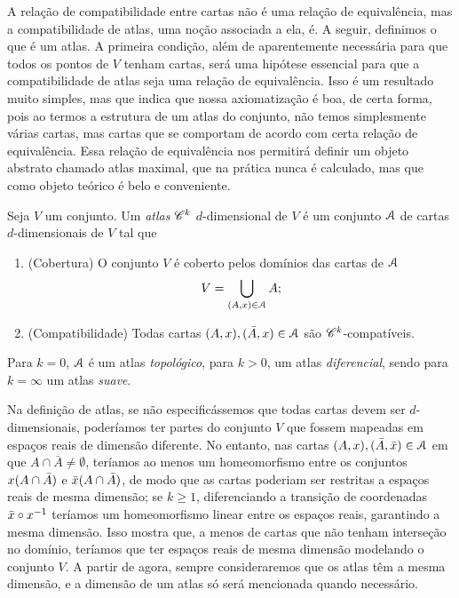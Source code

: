 A relação de compatibilidade entre cartas não é uma relação de equivalência, mas a compatibilidade de atlas, uma noção associada a ela, é. A seguir, definimos o que é um atlas. A primeira condição, além de aparentemente necessária para que todos os pontos de $V$ tenham cartas, será uma hipótese essencial para que a compatibilidade de atlas seja uma relação de equivalência. Isso é um resultado muito simples, mas que indica que nossa axiomatização é boa, de certa forma, pois ao termos a estrutura de um atlas do conjunto, não temos simplesmente várias cartas, mas cartas que se comportam de acordo com certa relação de equivalência. Essa relação de equivalência nos permitirá definir um objeto abstrato chamado atlas maximal, que na prática nunca é calculado, mas que como objeto teórico é belo e conveniente.

\begin{definition}
Seja $V$ um conjunto. Um \emph{atlas} $\mathscr{C}^k$ $d$-dimensional de $V$ é um conjunto $\mathcal{A}$ de cartas $d$-dimensionais de $V$ tal que
	\begin{enumerate}
	\item (Cobertura) O conjunto $V$ é coberto pelos domínios das cartas de $\mathcal{A}$
	\begin{equation*}
	V = \displaystyle\bigcup_{(A,x) \in \mathcal{A}} A;
	\end{equation*}
	\item (Compatibilidade) Todas cartas $(A,x), (\bar A,x) \in \mathcal{A}$  são $\mathscr{C}^k$-compatíveis.
	\end{enumerate}
Para $k=0$, $\mathcal{A}$ é um atlas \emph{topológico}, para $k>0$, um atlas \emph{diferencial}, sendo para $k=\infty$ um atlas \emph{suave}.
\end{definition}

Na definição de atlas, se não especificássemos que todas cartas devem ser $d$-dimensionais, poderíamos ter partes do conjunto $V$ que fossem mapeadas em espaços reais de dimensão diferente. No entanto, nas cartas $(A,x), (\bar A,\bar {x}) \in \mathcal{A}$ em que $A \cap \bar A \neq \emptyset$, teríamos ao menos um homeomorfismo entre os conjuntos $x(A \cap \bar A)$ e $\bar{x}(A \cap \bar A)$, de modo que as cartas poderiam ser restritas a espaços reais de mesma dimensão; se $k \geq 1$, diferenciando a transição de coordenadas $\bar{x} \circ x^{-1}$ teríamos um homeomorfismo linear entre os espaços reais, garantindo a mesma dimensão. Isso mostra que, a menos de cartas que não tenham interseção no domínio, teríamos que ter espaços reais de mesma dimensão modelando o conjunto $V$. A partir de agora, sempre consideraremos que os atlas têm a mesma dimensão, e a dimensão de um atlas só será mencionada quando necessário.

